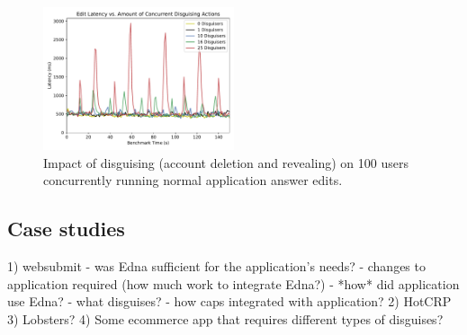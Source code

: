 \begin{figure}[t!]
    \centering
        \includegraphics[width=0.5\textwidth]{figs/concurrent_results_20lec_100users}
    \caption{Impact of disguising (account deletion and revealing) on 100 users concurrently running
    normal application answer edits.} 
    \label{fig:concurrent}
\end{figure}

\subsection{Case studies}
   1) websubmit
      - was Edna sufficient for the application's needs?
      - changes to application required (how much work to integrate Edna?)
      - *how* did application use Edna?
        - what disguises?
        - how caps integrated with application?
   2) HotCRP
   3) Lobsters?
   4) Some ecommerce app that requires different types of disguises?
